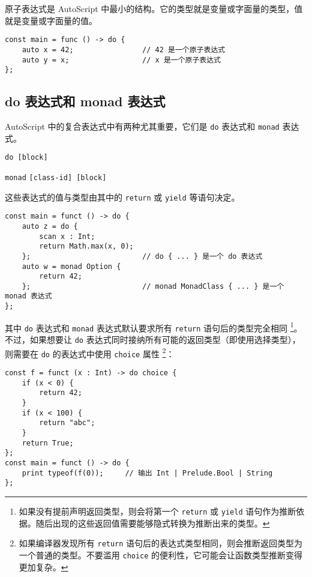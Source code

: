 原子表达式是 AutoScript 中最小的结构。它的类型就是变量或字面量的类型，值就是变量或字面量的值。

\begin{lstlisting}
const main = func () -> do {
    auto x = 42;                // 42 是一个原子表达式
    auto y = x;                 // x 是一个原子表达式
};
\end{lstlisting}

\subsection{do 表达式和 monad 表达式}

AutoScript 中的复合表达式中有两种尤其重要，它们是 \lstinline!do! 表达式和 \lstinline!monad! 表达式。

\begin{grammar} \label{grm:do-expression}
	\lstinline!do [block]!
\end{grammar}

\begin{grammar} \label{grm:monad-expression}
	\lstinline!monad! \texttt{[class-id] [block]}
\end{grammar}

这些表达式的值与类型由其中的 \lstinline!return! 或 \lstinline!yield! 等语句决定。

\begin{lstlisting}
const main = funct () -> do {
    auto z = do {
        scan x : Int;
        return Math.max(x, 0);
    };                          // do { ... } 是一个 do 表达式
    auto w = monad Option {
        return 42;
    };                          // monad MonadClass { ... } 是一个 monad 表达式
};
\end{lstlisting}

其中 \lstinline!do! 表达式和 \lstinline!monad! 表达式默认要求所有 \lstinline!return! 语句后的类型完全相同 \footnote{如果没有提前声明返回类型，则会将第一个 \lstinline!return! 或 \lstinline!yield! 语句作为推断依据。随后出现的这些返回值需要能够隐式转换为推断出来的类型。}。不过，如果想要让 \lstinline!do! 表达式同时接纳所有可能的返回类型（即使用选择类型），则需要在 \lstinline!do! 的表达式中使用 \lstinline!choice! 属性 \footnote{如果编译器发现所有 \lstinline!return! 语句后的表达式类型相同，则会推断返回类型为一个普通的类型。不要滥用 \lstinline!choice! 的便利性，它可能会让函数类型推断变得更加复杂。}：

\begin{lstlisting}
const f = funct (x : Int) -> do choice {
    if (x < 0) {
        return 42;
    }
    if (x < 100) {
        return "abc";
    }
    return True;
};
const main = funct () -> do {
    print typeof(f(0));     // 输出 Int | Prelude.Bool | String
};
\end{lstlisting}

